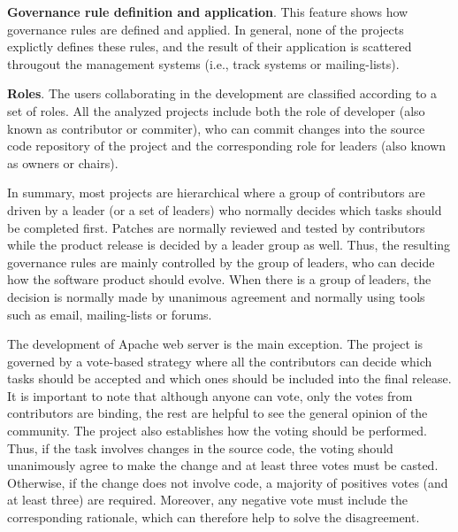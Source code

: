 \vspace{0.15em}
\noindent \textbf{Governance rule definition and application}. This feature shows how governance rules are defined and applied. In general, none of the projects explictly defines these rules, and the result of their application is scattered througout the management systems (i.e., track systems or mailing-lists).


\vspace{0.15em}
\noindent \textbf{Roles}. The users collaborating in the development are classified according to a set of roles. All the analyzed projects include both the role of developer (also known as contributor or commiter), who can commit changes into the source code repository of the project and the corresponding role for leaders (also known as owners or chairs).

In summary, most projects are hierarchical where a group of contributors are driven by a leader (or a set of leaders) who normally decides which tasks should be completed first. Patches are normally reviewed and tested by contributors while the product release is decided by a leader group as well. Thus, the resulting governance rules are mainly controlled by the group of leaders, who can decide how the software product should evolve. When there is a group of leaders, the decision is normally made by unanimous agreement and normally using tools such as email, mailing-lists or forums. 

The development of Apache web server is the main exception. The project is governed by a vote-based strategy where all the contributors can decide which tasks should be accepted and which ones should be included into the final release. It is important to note that although anyone can vote, only the votes from contributors are binding, the rest are helpful to see the general opinion of the community. The project also establishes how the voting should be performed. Thus, if the task involves changes in the source code, the voting should unanimously agree to make the change and at least three votes must be casted. Otherwise, if the change does not involve code, a majority of positives votes (and at least three) are required. Moreover, any negative vote must include the corresponding rationale, which can therefore help to solve the disagreement.

